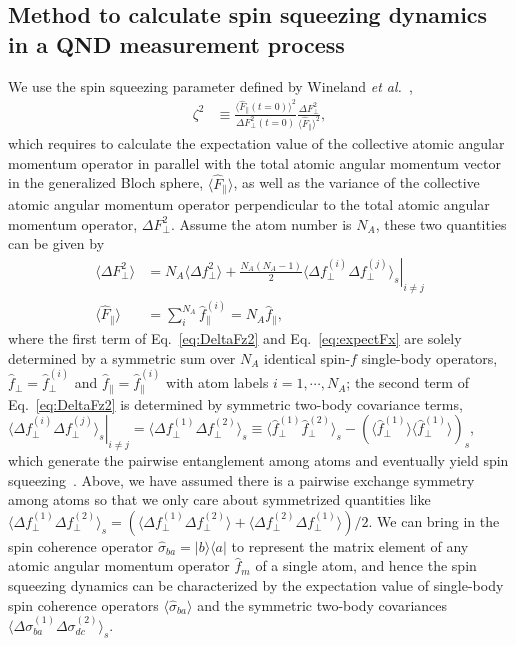 \documentclass[preprint,aps,pra,onecolumn,superscriptaddress]{revtex4-1} %
\def\bra#1{\langle{#1}\rvert}%
\def\ket#1{\lvert{#1}\rangle}%
\newcommand{\expect}[1]{\big\langle #1 \big\rangle}
\begin{document}
\subsection{Method to calculate spin squeezing dynamics in a QND measurement process}
We use the spin squeezing parameter defined by Wineland {\emph{et al.}}~\cite{Wineland1992},
\begin{align}
\zeta^2 &\equiv \frac{\expect{\hat{F}_\parallel(t=0)}^2}{\Delta F_\perp^2(t=0)} \frac{\Delta F_\perp^2}{\expect{\hat{F}_\parallel}^2},
\end{align}
which requires to calculate the expectation value of the collective atomic angular momentum operator in parallel with the total atomic angular momentum vector in the generalized Bloch sphere, $ \expect{\hat{F}_\parallel} $, as well as the variance of the collective atomic angular momentum operator perpendicular to the total atomic angular momentum operator, $ \Delta F_\perp^2 $. 
Assume the atom number is $ N_A $, these two quantities can be given by 
\begin{align}
\expect{\Delta F_\perp^2} &= N_A \expect{\Delta f_\perp^2}+\frac{N_A(N_A-1)}{2}\left. \expect{\Delta f_\perp^{(i)}\Delta f_\perp^{(j)}}_s\right|_{i\neq j}\label{eq:DeltaFz2}\\
\expect{\hat{F}_\parallel } &= \sum_i^{N_A} \hat{f}_\parallel ^{(i)}=N_A \hat{f}_\parallel,\label{eq:expectFx}
\end{align}
where the first term of Eq.~\eqref{eq:DeltaFz2} and Eq.~\eqref{eq:expectFx} are solely determined by a symmetric sum over $N_A$ identical spin-$f$ single-body operators, $ \hat{f}_\perp=\hat{f}_\perp^{(i)} $ and $ \hat{f}_\parallel=\hat{f}_\parallel^{(i)} $ with atom labels $ i=1,\cdots,N_A $; the second term of Eq.~\eqref{eq:DeltaFz2} is determined by symmetric two-body covariance terms, $ \left.\expect{\Delta f_\perp^{(i)}\Delta f_\perp^{(j)}}_s\right|_{i\neq j}=\expect{\Delta f_\perp^{(1)}\Delta f_\perp^{(2)}}_s\equiv \expect{\hat{f}_\perp^{(1)}\hat{f}_\perp^{(2)}}_s-\left( \expect{\hat{f}_\perp^{(1)}} \expect{\hat{f}_\perp^{(1)}}\right)_s $, which generate the pairwise entanglement among atoms and eventually yield spin squeezing~\cite{Wang2003Spin}.
Above, we have assumed there is a pairwise exchange symmetry among atoms so that we only care about symmetrized quantities like $ \expect{\Delta f_\perp^{(1)}\Delta f_\perp^{(2)}}_s=\left(\expect{\Delta f_\perp^{(1)}\Delta f_\perp^{(2)}} + \expect{\Delta f_\perp^{(2)}\Delta f_\perp^{(1)}} \right)/2 $. 
We can bring in the spin coherence operator $\hat{\sigma}_{ba}=\ket{b}\bra{a}$ to represent the matrix element of any atomic angular momentum operator $ \hat{f}_m $ of a single atom, and hence the spin squeezing dynamics can be characterized by the expectation value of single-body spin coherence operators $\expect{\hat{\sigma}_{ba}}$ and the symmetric two-body covariances $\expect{\Delta \sigma_{ba}^{(1)}\Delta\sigma_{dc}^{(2)} }_s$. 
\end{document}

